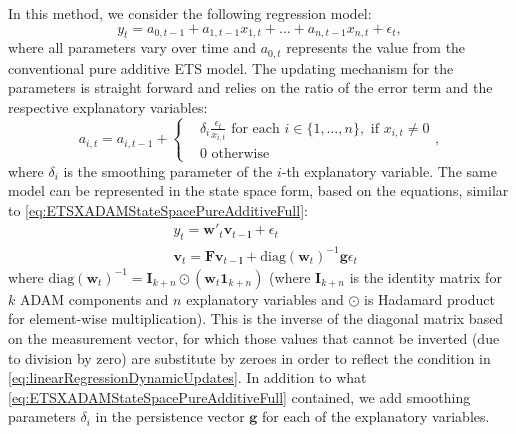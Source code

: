 \documentclass[
]{book}
\theoremstyle{definition}
\theoremstyle{definition}
\theoremstyle{definition}
\theoremstyle{definition}
\theoremstyle{remark}
\begin{document}
In this method, we consider the following regression model:
\begin{equation}
    y_{t} = a_{0,t-1} + a_{1,t-1} x_{1,t} + \dots + a_{n,t-1} x_{n,t} + \epsilon_t ,
  \label{eq:linearRegressionDynamic}
\end{equation}
where all parameters vary over time and \(a_{0,t}\) represents the value from the conventional pure additive ETS model. The updating mechanism for the parameters is straight forward and relies on the ratio of the error term and the respective explanatory variables:
\begin{equation}
    a_{i,t} = a_{i,t-1} + \left \lbrace \begin{aligned}
                  &\delta_i \frac{\epsilon_t}{x_{i,t}} \text{ for each } i \in \{1, \dots, n\}, \text{ if } x_{i,t}\neq 0 \\
                  &0 \text{ otherwise }
            \end{aligned} \right. ,
  \label{eq:linearRegressionDynamicUpdates}
\end{equation}
where \(\delta_i\) is the smoothing parameter of the \(i\)-th explanatory variable. The same model can be represented in the state space form, based on the equations, similar to \eqref{eq:ETSXADAMStateSpacePureAdditiveFull}:
\begin{equation}
  \begin{aligned}
    & {y}_{t} = \mathbf{w}'_t \mathbf{v}_{t-\boldsymbol{l}} + \epsilon_t \\
    & \mathbf{v}_t = \mathbf{F} \mathbf{v}_{t-\boldsymbol{l}} + \mathrm{diag}\left(\mathbf{w}_t\right)^{-1} \mathbf{g} \epsilon_t
  \end{aligned}
  \label{eq:ADAMETSXPureAdditiveDynamicFull}
\end{equation}
where \(\mathrm{diag}\left(\mathbf{w}_t\right)^{-1}=\mathbf{I}_{k+n} \odot (\mathbf{w}_t \mathbf{1}_{k+n})\) (where \(\mathbf{I}_{k+n}\) is the identity matrix for \(k\) ADAM components and \(n\) explanatory variables and \(\odot\) is Hadamard product for element-wise multiplication). This is the inverse of the diagonal matrix based on the measurement vector, for which those values that cannot be inverted (due to division by zero) are substitute by zeroes in order to reflect the condition in \eqref{eq:linearRegressionDynamicUpdates}. In addition to what \eqref{eq:ETSXADAMStateSpacePureAdditiveFull} contained, we add smoothing parameters \(\delta_i\) in the persistence vector \(\mathbf{g}\) for each of the explanatory variables.
\end{document}
